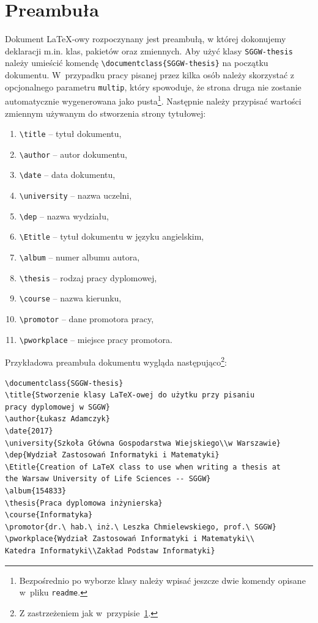 \documentclass{SGGW-thesis}
\begin{document}
\section{Preambuła}
Dokument \LaTeX-owy rozpoczynany jest preambułą, w której dokonujemy deklaracji m.in. klas, pakietów oraz zmiennych. Aby użyć klasy {\tt SGGW-thesis} należy umieścić komendę
\verb|\documentclass{SGGW-thesis}| na początku dokumentu. W~przypadku pracy pisanej przez kilka osób należy skorzystać z opcjonalnego parametru \verb|multip|, który
spowoduje, że strona druga nie zostanie automatycznie wygenerowana jako pusta\footnote{\label{not:nowekomendy}Bezpośrednio po wyborze klasy należy wpisać jeszcze dwie komendy opisane w~pliku {\tt readme}.}. Następnie należy przypisać wartości zmiennym używanym do stworzenia strony tytułowej:
\begin{enumerate}[label=\alph*.]
\item{\verb|\title| -- tytuł dokumentu,}
\item{\verb|\author| -- autor dokumentu,}
\item{\verb|\date|  -- data dokumentu,}
\item{\verb|\university| -- nazwa uczelni,}
\item{\verb|\dep| -- nazwa wydziału,}
\item{\verb|\Etitle| -- tytuł dokumentu w języku angielskim,}
\item{\verb|\album| -- numer albumu autora,}
\item{\verb|\thesis| -- rodzaj pracy dyplomowej,}
\item{\verb|\course| -- nazwa kierunku,}
\item{\verb|\promotor| -- dane promotora pracy,}
\item{\verb|\pworkplace| -- miejsce pracy promotora.}
\end{enumerate}
Przykładowa preambuła dokumentu wygląda następująco\footnote{Z zastrzeżeniem jak w~przypisie~\ref{not:nowekomendy}.}:\vspace{-0.85ex}
\begin{verbatim}
\documentclass{SGGW-thesis}
\title{Stworzenie klasy LaTeX-owej do użytku przy pisaniu
pracy dyplomowej w SGGW}
\author{Łukasz Adamczyk}
\date{2017}
\university{Szkoła Główna Gospodarstwa Wiejskiego\\w Warszawie}
\dep{Wydział Zastosowań Informatyki i Matematyki}
\Etitle{Creation of LaTeX class to use when writing a thesis at
the Warsaw University of Life Sciences -- SGGW}
\album{154833}
\thesis{Praca dyplomowa inżynierska}
\course{Informatyka}
\promotor{dr.\ hab.\ inż.\ Leszka Chmielewskiego, prof.\ SGGW}
\pworkplace{Wydział Zastosowań Informatyki i Matematyki\\
Katedra Informatyki\\Zakład Podstaw Informatyki}
\end{verbatim}\vspace{-0.6ex}
\end{document}
